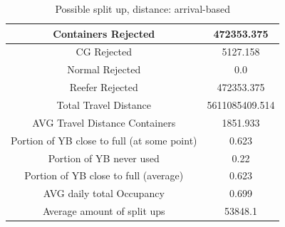\documentclass{article}
\begin{document}
\begin{table}[h]
    \centering
    \begin{tabular}{|c|c|}
        \hline
        Containers Rejected                         & 472353.375     \\ \hline
        CG Rejected                                 & 5127.158       \\ \hline
        Normal Rejected                             & 0.0            \\ \hline
        Reefer Rejected                             & 472353.375     \\ \hline
        Total Travel Distance                       & 5611085409.514 \\ \hline
        AVG Travel Distance Containers              & 1851.933       \\ \hline
        Portion of YB close to full (at some point) & 0.623          \\
        \hline
        Portion of YB never used                    & 0.22           \\ \hline
        Portion of YB close to full (average)       & 0.623          \\ \hline

        AVG daily total Occupancy                   & 0.699          \\ \hline Average amount of split ups &
        53848.1                                                      \\ \hline
    \end{tabular}
    \caption{Possible split up, distance: arrival-based}
\end{table}
\end{document}
